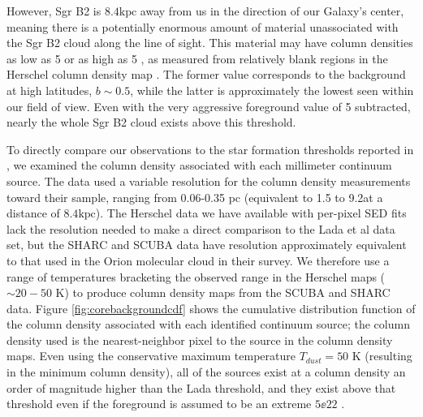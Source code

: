 \documentclass[twocolumn]{aastex61}
\newcommand{\dsgrb}{\ensuremath{8.4 \textrm{kpc}}\xspace}
\begin{document}
However, Sgr B2 is \dsgrb away from us in the direction of our Galaxy's
center, meaning there is a potentially enormous amount of material unassociated
with the Sgr B2 cloud along the line of sight.  This material may have column
densities as low as
5 \persc or as high as 5 \persc, as measured from relatively
blank regions in the Herschel column density map \citep{Battersby2011a}.  The
former value corresponds to
the background at high latitudes, $b\sim0.5$, while the latter  is
approximately the lowest seen within our field of view. 
Even with the very aggressive foreground value of 5 \persc subtracted,
nearly the whole Sgr B2 cloud exists above this threshold.

To directly compare our observations to the star formation thresholds reported
in \citet{Lada2010a}, we examined the column density associated with each
millimeter continuum source.  The \citet{Lada2010a} data used a variable
resolution for the column density measurements toward their sample, ranging from
0.06-0.35 pc (equivalent to 1.5 to 9.2\arcsec at a distance of \dsgrb).  The
Herschel data we have available with per-pixel SED fits lack the resolution
needed to make a direct comparison to the Lada et al data set, but the SHARC
and SCUBA data have resolution approximately equivalent to that used in the
Orion molecular cloud in their survey.  We therefore use a range of temperatures
bracketing the observed range in the Herschel maps ($\sim20-50$ K) to produce
column density maps from the SCUBA and SHARC data.  Figure
\ref{fig:corebackgroundcdf} shows the cumulative distribution function of the
column density associated with each identified continuum source; the column
density used is the nearest-neighbor pixel to the source in the column density
maps.  Even using the conservative maximum temperature $T_{dust}=50$ K
(resulting in the minimum column density), all of the sources exist at a column
density an order of magnitude higher than the Lada threshold, and they exist
above that threshold even if the foreground is assumed to be an extreme $5\ee{22}$
\persc.
\end{document}
